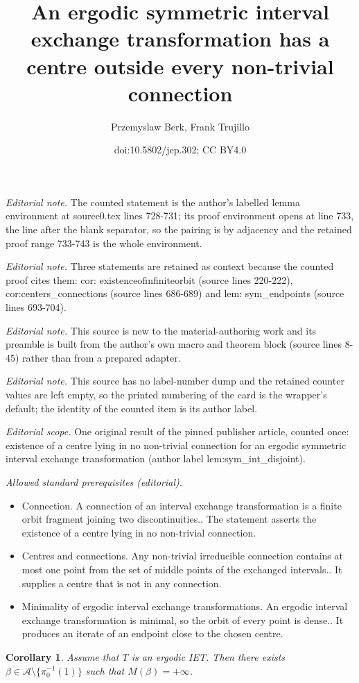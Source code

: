 \documentclass[10pt,a4paper]{article}
\title{An ergodic symmetric interval exchange transformation has a centre outside every non-trivial connection}
\author{Przemyslaw Berk, Frank Trujillo}
\date{doi:10.5802/jep.302; CC BY4.0}
\theoremstyle{plain}
\newtheorem{corollary}[theorem]{Corollary}
\theoremstyle{definition}
\begin{document}
\maketitle
\noindent\textit{Editorial note.} The counted statement is the author's labelled lemma environment at source0.tex lines 728-731; its proof environment opens at line 733, the line after the blank separator, so the pairing is by adjacency and the retained proof range 733-743 is the whole environment.\par\medskip
\noindent\textit{Editorial note.} Three statements are retained as context because the counted proof cites them: cor: existenceofinfiniteorbit (source lines 220-222), cor:centers\_connections (source lines 686-689) and lem: sym\_endpoints (source lines 693-704).\par\medskip
\noindent\textit{Editorial note.} This source is new to the material-authoring work and its preamble is built from the author's own macro and theorem block (source lines 8-45) rather than from a prepared adapter.\par\medskip
\noindent\textit{Editorial note.} This source has no label-number dump and the retained counter values are left empty, so the printed numbering of the card is the wrapper's default; the identity of the counted item is its author label.\par\medskip
\noindent\textit{Editorial scope.} One original result of the pinned publisher article, counted once: existence of a centre lying in no non-trivial connection for an ergodic symmetric interval exchange transformation (author label lem:sym\_int\_disjoint).\par\medskip
\noindent\textit{Allowed standard prerequisites (editorial).}\begin{itemize}
\item Connection. A connection of an interval exchange transformation is a finite orbit fragment joining two discontinuities.. The statement asserts the existence of a centre lying in no non-trivial connection.
\item Centres and connections. Any non-trivial irreducible connection contains at most one point from the set of middle points of the exchanged intervals.. It supplies a centre that is not in any connection.
\item Minimality of ergodic interval exchange transformations. An ergodic interval exchange transformation is minimal, so the orbit of every point is dense.. It produces an iterate of an endpoint close to the chosen centre.
\end{itemize}\medskip
\begin{corollary}\label{cor: existenceofinfiniteorbit}
Assume that $T$ is an ergodic IET. Then there exists {$\beta \in\mathcal A \setminus \{\pi_0^{-1}(1)\}$ such that $M(\beta) = +\infty$. }
\end{corollary}
\end{document}
